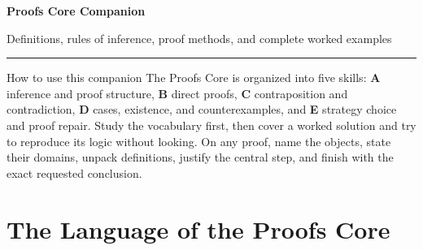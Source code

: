 \documentclass[10pt]{article}
\begin{document}
\begin{center}
  {\Huge\bfseries\color{ProofNavy} Proofs Core Companion}\par
  \vspace{3pt}
  {\large Definitions, rules of inference, proof methods, and complete worked examples}\par
  \vspace{5pt}
  \color{ProofTeal}\rule{0.88\linewidth}{1.1pt}
\end{center}

\begin{checklistbox}{How to use this companion}
The Proofs Core is organized into five skills: \textbf{A} inference and proof
structure, \textbf{B} direct proofs, \textbf{C} contraposition and contradiction,
\textbf{D} cases, existence, and counterexamples, and \textbf{E} strategy choice
and proof repair. Study the vocabulary first, then cover a worked solution and
try to reproduce its logic without looking. On any proof, name the objects,
state their domains, unpack definitions, justify the central step, and finish
with the exact requested conclusion.
\end{checklistbox}

\section*{The Language of the Proofs Core}
\end{document}
